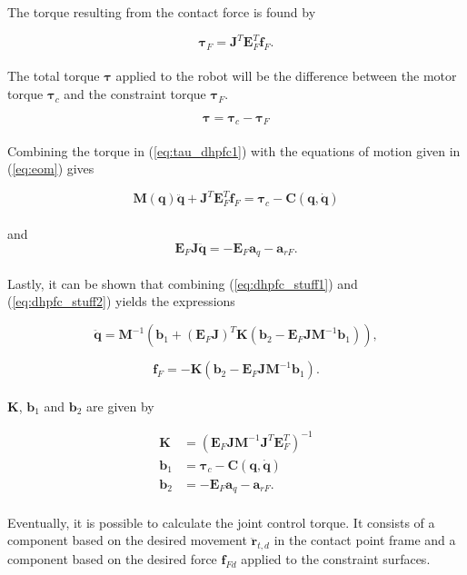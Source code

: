 The torque resulting from the contact force is found by

\begin{equation}
    \boldsymbol{\tau}_F = \mathbf{J}^T \mathbf{E}_F^T \mathbf{f}_F.
\end{equation}
\\
The total torque $\boldsymbol{\tau}$ applied to the robot will be the difference between the motor torque $\boldsymbol{\tau}_c$ and the constraint torque $\boldsymbol{\tau}_F$.

\begin{equation}\label{eq:tau_dhpfc1}
    \boldsymbol{\tau} = \boldsymbol{\tau}_c - \boldsymbol{\tau}_F
\end{equation}
\\

Combining the torque in (\ref{eq:tau_dhpfc1}) with the equations of motion given in (\ref{eq:eom}) gives

\begin{equation}\label{eq:dhpfc_stuff1}
    \mathbf{M(q) \ddot{q}} + \mathbf{J}^T \mathbf{E}^T_F \mathbf{f}_F = \boldsymbol{\tau}_c - \mathbf{C(q, \dot{q})}
\end{equation}
\\
and
\begin{equation}\label{eq:dhpfc_stuff2}
    \mathbf{E}_F \mathbf{J\ddot{q}} = - \mathbf{E}_F \mathbf{a}_q - \mathbf{a}_{rF}.
\end{equation}
\\
Lastly, it can be shown that combining (\ref{eq:dhpfc_stuff1}) and (\ref{eq:dhpfc_stuff2}) yields the expressions

\begin{equation}
    \mathbf{\ddot{q}} = \mathbf{M}^{-1}(\mathbf{b}_1 + (\mathbf{E}_F \mathbf{J})^T \mathbf{K} (\mathbf{b}_2 - \mathbf{E}_F \mathbf{J} \mathbf{M}^{-1} \mathbf{b}_1)),
\end{equation}

\begin{equation}
    \mathbf{f}_F = -\mathbf{K} (\mathbf{b}_2 - \mathbf{E}_F \mathbf{J} \mathbf{M}^{-1} \mathbf{b}_1).
\end{equation}
\\
$\mathbf{K}$, $\mathbf{b}_1$ and $\mathbf{b}_2$ are given by

\begin{equation}
    \begin{split}
        \mathbf{K} &= (\mathbf{E}_F \mathbf{J} \mathbf{M}^{-1} \mathbf{J}^T \mathbf{E}^T_F)^{-1}\\
        \mathbf{b}_1 &= \boldsymbol{\tau}_c - \mathbf{C(q, \dot{q})}\\
        \mathbf{b}_2 &= - \mathbf{E}_F \mathbf{a}_q - \mathbf{a}_{rF}.
    \end{split}
\end{equation}
\\
Eventually, it is possible to calculate the joint control torque. It consists of a component based on the desired movement $\mathbf{\ddot{r}}_{t,d}$ in the contact point frame and a component based on the desired force $\mathbf{f}_{Fd}$ applied to the constraint surfaces.

